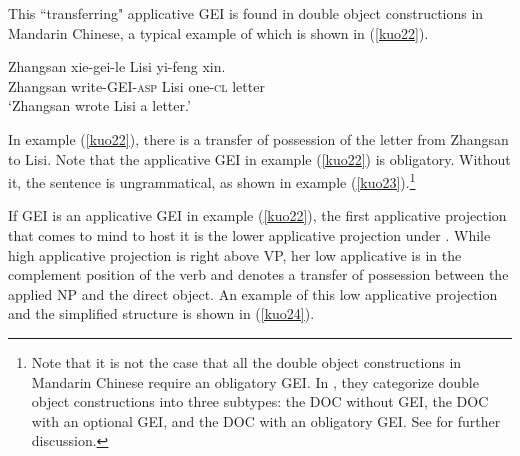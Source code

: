 \documentclass[output=paper,colorlinks,citecolor=brown]{langscibook}
\begin{document}
This “transferring" applicative GEI is found in double object constructions in Mandarin Chinese, a typical example of which is shown in (\ref{kuo22}).

\ea
\label{kuo22}
\gll Zhangsan   xie-gei-le              Lisi    yi-feng          xin.\\  
     Zhangsan   write-GEI-\textsc{asp}  Lisi    one-\textsc{cl} letter\\ 
\glt `Zhangsan wrote Lisi a letter.'
\z

In example (\ref{kuo22}), there is a transfer of possession of the letter from Zhangsan to Lisi. Note that the applicative GEI in example (\ref{kuo22}) is obligatory. Without it, the sentence is ungrammatical, as shown in example (\ref{kuo23}).\footnote{Note that it is not the case that all the double object constructions in Mandarin Chinese require an obligatory GEI. In \citet{Li1&Thompson}, they categorize double object constructions into three subtypes: the DOC without GEI, the DOC with an optional GEI, and the DOC with an obligatory GEI. See \citet{Li1&Thompson} for further discussion.}


\z

If GEI is an applicative GEI in example (\ref{kuo22}), the first applicative projection that comes to mind to host it is the lower applicative projection under \citet{Pylkkanen2002,Pylkkanen2008}. While  high applicative projection is right above VP, her low applicative is in the complement position of the verb and denotes a transfer of possession between the applied NP and the direct object. An example of this low applicative projection and the simplified structure is shown in (\ref{kuo24}).

\ea
    \label{kuo24}
    \z
\z
\end{document}
